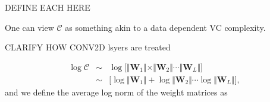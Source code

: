 DEFINE EACH HERE

One can view $\mathcal{C}$ as something akin to a data dependent VC complexity.

CLARIFY HOW CONV2D lsyers are treated



\begin{eqnarray*}
\log\mathcal{C} &\sim& \log\bigg[\Vert\mathbf{W}_{1}\Vert\times\Vert\mathbf{W}_{2}\Vert\cdots\Vert\mathbf{W}_{L}\Vert\bigg]  \\
                &\sim& \bigg[\log\Vert\mathbf{W}_{1}\Vert+\log\Vert\mathbf{W}_{2}\Vert\cdots\log\Vert\mathbf{W}_{L}\Vert\bigg]  ,
\end{eqnarray*}
and we define the average log norm of the weight matrices as







